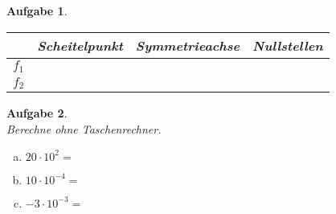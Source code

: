 \documentclass[12pt,fleqn]{article}
\theoremstyle{aufg}
\newtheorem{aufgabe}{Aufgabe}
\theoremstyle{bsp}
\begin{document}
\begin{flushleft}
\begin{aufgabe}
\begin{minipage}{0.25\textwidth}
\end{minipage} 
\begin{minipage}{0.1\textwidth} 
 ~ \end{minipage} 
\begin{minipage}{0.55\textwidth} 
\renewcommand{\arraystretch}{1.5} 
\begin{tabular}{c|c|c|c}
 & Scheitelpunkt & Symmetrieachse & Nullstellen\\ \hline 
$f_1$ &  &  & \\ \hline 
$f_2$ &  &  & \\ 

\end{tabular} 

\end{minipage} 

\end{aufgabe} 
\begin{aufgabe} ~ \\ 
Berechne ohne Taschenrechner. \\ 
\begin{multicols}{3} 
\begin{enumerate}[a)] 
\item 
$20\cdot10^{2}=$
\item 
$10\cdot10^{-4}=$
\item 
$-3\cdot10^{-3}=$
\end{enumerate} 
\end{multicols} 
\end{aufgabe} 


\end{flushleft}
\end{document}
